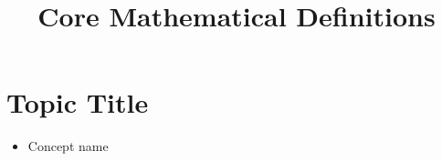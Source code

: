 \documentclass[11pt,a4paper]{article}
\title{Core Mathematical Definitions}
\author{}
\date{}
\begin{document}
\maketitle

\section{Topic Title}
\begin{itemize}
\item Concept name
\end{itemize}
\end{document}
